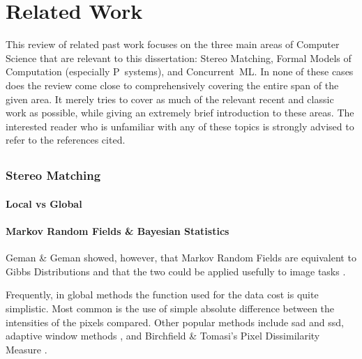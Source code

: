 \chapter{Related Work}
This review of related past work focuses on the three main areas of Computer Science that are relevant to this dissertation:  Stereo Matching, Formal Models of Computation (especially P~systems), and Concurrent~ML.  In none of these cases does the review come close to comprehensively covering the entire span of the given area.  It merely tries to cover as much of the relevant recent and classic work as possible, while giving an extremely brief introduction to these areas.  The interested reader who is unfamiliar with any of these topics is strongly advised to refer to the references cited.

\section{}



\subsection{Stereo Matching}

\subsubsection{Local vs Global}
\cite{Scharstein2002}

\subsubsection{Markov Random Fields \& Bayesian Statistics}
\cite{Kolmogorov2015,Blake2011}

Geman \& Geman \cite{Geman1984} showed, however, that Markov Random Fields are equivalent to Gibbs Distributions and that the two could be applied usefully to image tasks \cite{Gimelfarb1999}.

Frequently, in global methods the function used for the data cost is quite simplistic.  Most common is the use of simple absolute difference between the intensities of the pixels compared.  Other popular methods include \gls{sad} and \gls{ssd}, adaptive window methods \cite{Yoon2005,Yoon2006}, and Birchfield \& Tomasi's Pixel Dissimilarity Measure \cite{Birchfield1998}.


